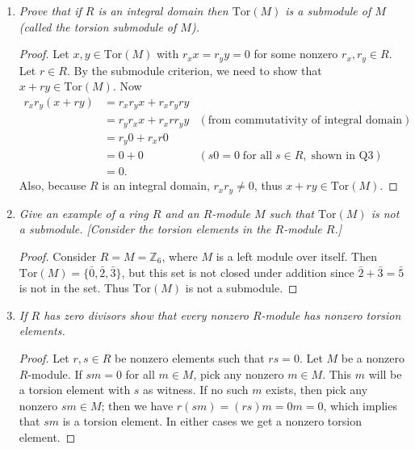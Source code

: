 \documentclass{article}
\begin{document}
  \begin{enumerate}[label={(\alph*)}]
    \item \it Prove that if $R$ is an integral domain then $\text{Tor}(M)$
      is a submodule of $M$ (called the torsion submodule of $M$).

      \begin{proof}
        Let $x,y\in\text{Tor}(M)$ with $r_xx=r_yy=0$ for some nonzero
        $r_x,r_y\in R$. Let $r\in R$. By the submodule criterion, we need
        to show that $x+ry\in\text{Tor}(M)$. Now
        \begin{align*}
          r_xr_y(x+ry) &= r_xr_yx+r_xr_yry \\
          &=r_yr_xx+r_xrr_yy &(\text{from commutativity of integral domain}) \\
          &=r_y0+r_xr0 \\
          &=0+0 &(s0=0\; \text{for all}\; s\in R,\; \text{shown in Q3}) \\
          &=0.
        \end{align*}
        Also, because $R$ is an integral domain, $r_xr_y\neq0$, thus
        $x+ry\in\text{Tor}(M)$.
      \end{proof}

    \item \it Give an example of a ring $R$ and an $R$-module $M$ such that
      $\text{Tor}(M)$ is not a submodule. [Consider the torsion elements in
      the $R$-module $R$.]

      \begin{proof}
        Consider $R=M=\mathbb{Z}_6$, where $M$ is a left module over
        itself. Then $\text{Tor}(M)=\{\bar{0},\bar{2},\bar{3}\}$, but this
        set is not closed under addition since $\bar{2}+\bar{3}=\bar{5}$ is
        not in the set. Thus $\text{Tor}(M)$ is not a submodule.
      \end{proof}

    \item \it If $R$ has zero divisors show that every nonzero $R$-module
      has nonzero torsion elements.
      \begin{proof}
        Let $r,s\in R$ be nonzero elements such that $rs=0$. Let $M$ be
        a nonzero $R$-module. If $sm=0$ for all $m\in M$, pick any
        nonzero $m\in M$. This $m$ will be a torsion element with $s$ as
        witness. If no such $m$ exists, then pick any nonzero $sm\in M$;
        then we have $r(sm)=(rs)m=0m=0$, which implies that $sm$ is a
        torsion element. In either cases we get a nonzero torsion element.
      \end{proof}
  \end{enumerate}
\end{document}
